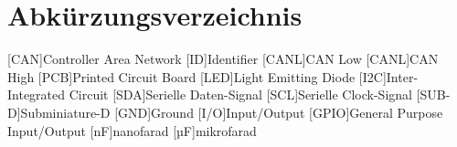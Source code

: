 \section*{Abkürzungsverzeichnis}

\begin{acronym}
    [CAN]{Controller Area Network}
    [ID]{Identifier}
    [CANL]{CAN Low}
    [CANL]{CAN High}
    [PCB]{Printed Circuit Board}
    [LED]{Light Emitting Diode}
    [I2C]{Inter-Integrated Circuit}
    [SDA]{Serielle Daten-Signal}
    [SCL]{Serielle Clock-Signal}
    [SUB-D]{Subminiature-D}
    [GND]{Ground}
    [I/O]{Input/Output}
    [GPIO]{General Purpose Input/Output}
    [nF]{nanofarad}
    [µF]{mikrofarad}
\end{acronym}
